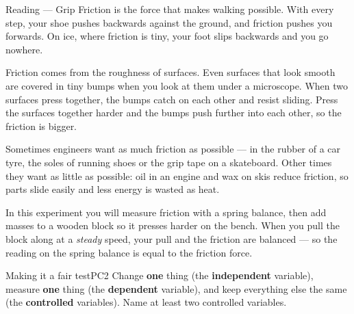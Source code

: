 
\begin{readingbox}{Reading --- Grip}
Friction is the force that makes walking possible. With every step, your shoe pushes backwards against the ground, and friction pushes you forwards. On ice, where friction is tiny, your foot slips backwards and you go nowhere.

Friction comes from the roughness of surfaces. Even surfaces that look smooth are covered in tiny bumps when you look at them under a microscope. When two surfaces press together, the bumps catch on each other and resist sliding. Press the surfaces together harder and the bumps push further into each other, so the friction is bigger.

Sometimes engineers want as much friction as possible --- in the rubber of a car tyre, the soles of running shoes or the grip tape on a skateboard. Other times they want as little as possible: oil in an engine and wax on skis reduce friction, so parts slide easily and less energy is wasted as heat.

In this experiment you will measure friction with a spring balance, then add masses to a wooden block so it presses harder on the bench. When you pull the block along at a \emph{steady} speed, your pull and the friction are balanced --- so the reading on the spring balance is equal to the friction force.
\end{readingbox}

\rcreset
{}


\begin{technique}{Making it a fair test}{PC2}
Change \textbf{one} thing (the \textbf{independent} variable), measure \textbf{one} thing (the \textbf{dependent} variable), and keep everything else the same (the \textbf{controlled} variables). Name at least two controlled variables.
\end{technique}

